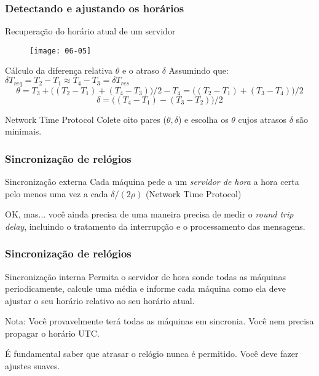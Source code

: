 \documentclass[Ligatures=TeX,table,brazil,svgnames,usetotalslideindicator,compress,10pt]{beamer}
\begin{document}
\begin{frame}
  \frametitle{Detectando e ajustando os horários}

  \begin{block}{Recuperação do horário atual de um servidor}
    \begin{figure}
      \centering
      \texttt{[image: 06-05]}
    \end{figure}
  \end{block}
  \begin{block}{Cálculo da diferença relativa $\theta$ e o atraso $\delta$}
    \small
    Assumindo que: $\delta T_{req} = T_2 - T_1 \approx T_4 - T_3 = \delta T_{res}$
    \[
    \theta = T_3 + \bigl(( T_2 - T_1 ) + ( T_4 - T_3 )\bigr)/{2} - T_4 = \bigl(( T_2 - T_1 ) + ( T_3 - T_4 )\bigr)/{2}
    \]
    \[
    \delta = \bigl((T_4-T_1) - (T_3 -T_2)\bigr)/{2}
    \]
  \end{block}
  \begin{block}{Network Time Protocol}
    Colete oito pares ($\theta, \delta$) e escolha os $\theta$ cujos atrasos $\delta$ são minimais.
  \end{block}
\end{frame}

\begin{frame}
  \frametitle{Sincronização de relógios}

  \begin{block}{Sincronização externa}
    Cada máquina pede a um \emph{servidor de hora} a hora certa pelo menos uma vez a cada $\delta/(2\rho)$ (\alert{Network Time Protocol})
  \end{block}

  \begin{alertblock}{OK, mas...}
    você ainda precisa de uma maneira precisa de medir o \textit{round trip delay}, incluindo o tratamento da interrupção e o processamento das mensagens.
  \end{alertblock}

\end{frame}

\begin{frame}
  \frametitle{Sincronização de relógios}

  \begin{block}{Sincronização interna}
    Permita o servidor de hora sonde todas as máquinas periodicamente, calcule uma média e informe cada máquina como ela deve ajustar o seu horário \alert{relativo ao seu horário atual}.
  \end{block}

  \begin{alertblock}{Nota:}
    Você provavelmente terá todas as máquinas em sincronia. Você nem precisa propagar o horário UTC.
  \end{alertblock}

  \begin{alertblock}{É fundamental}
    saber que atrasar o relógio \alert{nunca} é permitido. Você deve fazer ajustes suaves.
  \end{alertblock}

\end{frame}
\end{document}
